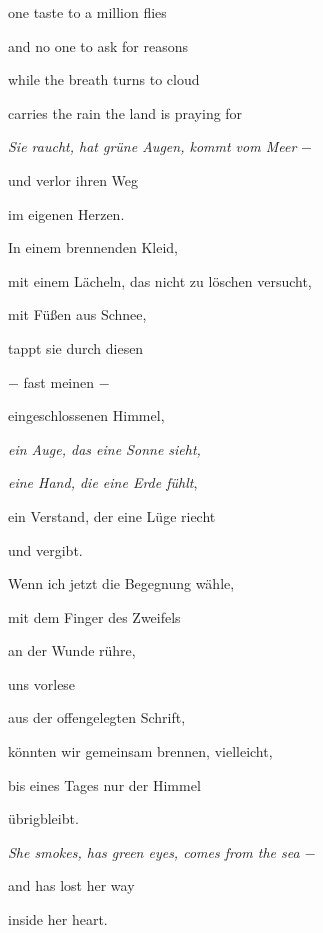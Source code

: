 one taste to a million flies

and no one to ask for reasons


\bigskip

while the breath turns to cloud

carries the rain the land is praying for



\bigskip

\emph{Sie raucht, hat grüne Augen, kommt vom Meer} $-$

und verlor ihren Weg 

im eigenen Herzen.


\bigskip

In einem brennenden Kleid,

mit einem Lächeln, das nicht zu löschen versucht,

mit Füßen aus Schnee, 


\bigskip

tappt sie durch diesen 

$-$ fast meinen $-$

eingeschlossenen Himmel,


\bigskip

\emph{
ein Auge, das eine Sonne sieht,}

\emph{eine Hand, die eine Erde fühlt},

ein Verstand, der eine Lüge riecht


\bigskip

und vergibt.

Wenn ich jetzt die Begegnung wähle,

mit dem Finger des Zweifels


\bigskip

an der Wunde rühre,

uns vorlese 

aus der offengelegten Schrift,


\bigskip

könnten wir gemeinsam brennen, vielleicht,

bis eines Tages nur der Himmel

übrigbleibt.


\bigskip



\bigskip

\emph{
She smokes, has green eyes, comes from the sea $-$}

and has lost her way

inside her heart.


